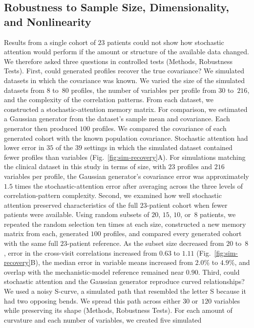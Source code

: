\subsection{Robustness to Sample Size, Dimensionality, and Nonlinearity}

Results from a single cohort of $23$ patients could not show how stochastic attention
would perform if the amount or structure of the available data changed. We therefore asked three
questions in controlled tests (Methods, Robustness Tests). First,
could generated profiles recover the true covariance? We simulated datasets in which the
covariance was known. We varied the size of the simulated datasets from $8$ to~$80$ profiles,
the number of variables per profile from $30$ to~$216$, and the complexity of the correlation patterns.
From each dataset, we constructed a stochastic-attention memory matrix. For comparison, we
estimated a Gaussian generator from the dataset's sample mean and covariance. Each generator
then produced $100$ profiles. We compared the covariance of each generated cohort
with the known population covariance. Stochastic attention had lower error in $35$ of the $39$ settings in which the
simulated dataset contained fewer profiles than variables (Fig.~\ref{fig:sim-recovery}A). For
simulations matching the clinical dataset in this study in terms of size, with $23$ profiles and $216$ variables per
profile, the Gaussian generator's covariance error was approximately $1.5$ times the stochastic-attention error
after averaging across the three levels of correlation-pattern complexity.
Second, we examined how well stochastic attention preserved characteristics of the full
$23$-patient cohort when fewer patients were available. Using random subsets of $20$, $15$, $10$, or~$8$ patients, we repeated the random selection ten times
at each size, constructed a new memory matrix from each, generated $100$ profiles, and compared every generated cohort with the same full $23$-patient
reference. As the subset size decreased from $20$ to~$8$, error in the cross-visit correlations
increased from $0.63$ to $1.11$ (Fig.~\ref{fig:sim-recovery}B), the median error in variable
means increased from $2.0\%$ to $4.9\%$, and overlap with the mechanistic-model
reference remained near $0.90$. Third, could stochastic attention and the Gaussian generator
reproduce curved relationships? We used a noisy S-curve, a simulated path that resembled the
letter S because it had two opposing bends. We spread this path across either $30$ or~$120$
variables while preserving its shape (Methods, Robustness Tests). For each amount of curvature and each number of variables, we created five simulated
